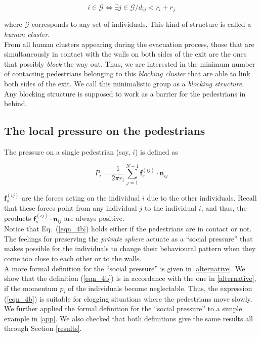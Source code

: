 \begin{equation}
 i\in\mathcal{G} \Leftrightarrow \exists j\in\mathcal{G}/d_{ij}<r_i+r_j
\end{equation}

\noindent where $\mathcal{G}$ corresponds to any set of individuals. 
 This kind of structure is called a \textit{human cluster}. \\

From all human clusters appearing during the evacuation process, those that 
are simultaneously in contact with the walls on both sides of the exit are 
the ones that possibly \textit{block} the way out. Thus, we are interested 
in the minimum number of contacting pedestrians belonging to this 
\textit{blocking cluster} that are able to link both sides of the exit. We call 
this minimalistic group as a \textit{blocking structure}. Any blocking structure 
is supposed to work as a barrier for the pedestrians in behind.   \\



\subsection{\label{pressure}The local pressure on the pedestrians}

The pressure on a single pedestrian (say, $i$) is defined as \cite{Helbing1}

\begin{equation} 
P_i=\displaystyle\frac{1}{2\pi 
r_i}\displaystyle\sum_{j=1}^{N-1}\mathbf{f}_s^{(ij)}\cdot\mathbf{n}_{ij}
\label{eqn_4b}
\end{equation}

$\mathbf{f}_{s}^{(ij)}$ are the forces acting on the individual $i$ due to the 
other individuals. Recall that these forces point from any individual $j$ to 
the individual $i$, and thus, the products 
$\mathbf{f}_{s}^{(ij)}\cdot\mathbf{n}_{ij}$ are always positive. \\ 

Notice that Eq.~(\ref{eqn_4b}) holds either if the pedestrians are in 
contact or not. The feelings for preserving the \textit{private sphere} 
actuate as a ``social pressure'' that makes possible for the individuals to 
change their behavioural pattern when they come too close to each other or to 
the walls.\\

A more formal definition for the ``social pressure'' is given in
\ref{alternative}. We show that the definition (\ref{eqn_4b}) is in accordance with the 
one in \ref{alternative}, if the momentum $p_i$ of the individuals become 
neglectable. Thus, the expression (\ref{eqn_4b}) is suitable for clogging 
situations where the pedestrians move slowly. \\

We further applied the formal definition for the ``social pressure'' to a 
simple example in \ref{app}. We also checked that both definitions 
give the same results all through Section \ref{results}. \\

